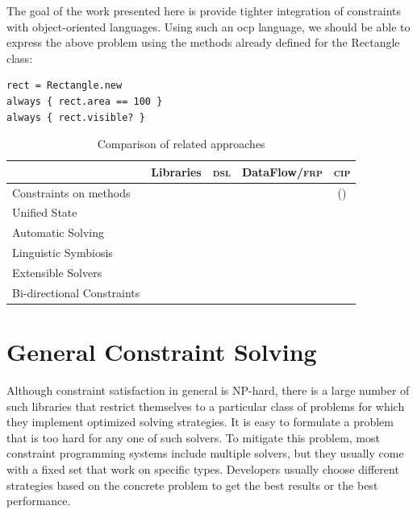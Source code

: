 The goal of the work presented here is provide tighter integration of
constraints with object-oriented languages. Using such an \acrlong{ocp}
language, we should be able to express the above problem using the methods
already defined for the Rectangle class:
\begin{lstlisting}
rect = Rectangle.new
always { rect.area == 100 }
always { rect.visible? }
\end{lstlisting}

\begin{table}
  \centering
  \tableinsidecommand
  \caption{Comparison of related approaches}
  \label{tab:cmp-constraint-lang-approaches}
  \begin{tabular}{lcccc}
    \toprule
    & Libraries & \textsc{dsl} & DataFlow/\textsc{frp} & \textsc{cip} \\
    \midrule
    Constraints on methods & & & & (\y) \\
    Unified State &  & \y & \y & \y \\
    Automatic Solving & & \y & \y & \y \\
    Linguistic Symbiosis & & & \y & \y \\
    Extensible Solvers & \y & & \y & \\
    Bi-directional Constraints & \y & \y & & \y \\
    \bottomrule
  \end{tabular}
\end{table}


\section{General Constraint Solving}
\label{sec:expect-imper-progr}
\label{sec:constr-solv-strat}

Although constraint satisfaction in general is NP-hard, there is a
large number of such libraries that restrict themselves to a
particular class of problems for which they implement optimized
solving strategies. It is easy to formulate a problem that is too hard
for any one of such solvers. To mitigate this problem, most constraint
programming systems include multiple solvers, but they
usually come with a fixed set that work on specific types. Developers
usually choose different strategies based on the concrete problem to
get the best results or the best performance.

